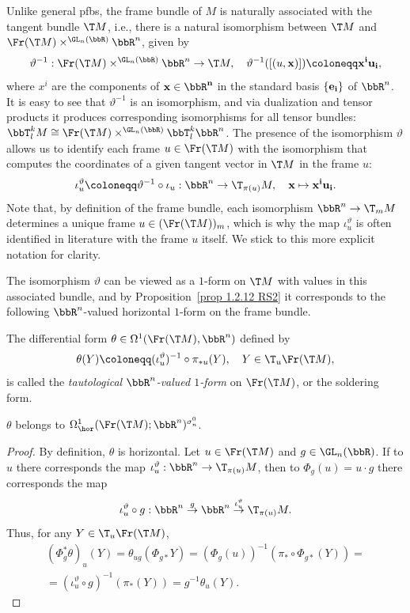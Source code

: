 Unlike general \glspl{pfb}, the frame bundle of $M$ is naturally associated with the tangent bundle $\T M$, i.e., there is a natural isomorphism between $\T M$ and  $\Fr(\T M)\times^{\GL_n(\bbR)}\bbR^n$, given by
\[\vartheta^{-1}:\Fr(\T M) \times^{\GL_n(\bbR)} \bbR^n\to \T M,\quad \vartheta^{-1}([(u,\bf{x})])\coloneqq x^iu_i,\label{eq 2.1.2 RS2}\]
where $x^i$ are the components of $\bf{x}\in\bbR^n$ in the standard basis $\{\bf{e}_i\}$ of $\bbR^n$. It is easy to see that $\vartheta^{-1}$ is an isomorphism, and via dualization and tensor products it produces corresponding isomorphisms for all tensor bundles: $\bbT^k_l M\cong \Fr(\T M)\times^{\GL_n(\bbR)}\bbT^k_l\bbR^n$. The presence of the isomorphism $\vartheta$ allows us to identify each frame $u\in \Fr(\T M)$ with the isomorphism that computes the coordinates of a given tangent vector in $\T M$ in the frame $u$:
\[\iota_u^\vartheta\coloneqq \vartheta^{-1}\circ\iota_u:\bbR^n\to \T_{\pi(u)}M,\quad \bf{x}\mapsto x^i u_i.\]
Note that, by definition of the frame bundle, each isomorphism $\bbR^n\to \T_mM$ determines a unique frame $u\in (\Fr(\T M))_m$, which is why the map $\iota_u^\vartheta$ is often identified in literature with the frame $u$ itself. We stick to this more explicit notation for clarity.

The isomorphism $\vartheta$ can be viewed as a $1$-form on $\T M$ with values in this associated bundle, and by Proposition~\ref{prop 1.2.12 RS2} it corresponds to the following $\bbR^n$-valued horizontal $1$-form on the frame bundle.

\begin{defn}
    The differential form $\theta\in\Omega^1(\Fr(\T M),\bbR^n)$ defined by
    \[\theta(Y)\coloneqq (\iota_u^\vartheta)^{-1}\circ\pi_{\ast u}(Y),\quad Y\in \T_u\Fr(\T M),\]
    is called the \emph{tautological $\bbR^n$-valued $1$-form} on $\Fr(\T M)$, or the soldering form.
\end{defn}


\begin{prop}[{{\cite[Prop.~2.1.4]{RS2}}}]\label{prop 2.1.4 RS2}
    $\theta$ belongs to $\Omega^1_{\hor}(\Fr(\T M); \bbR^n)^{\sigma_n^0}$.
\end{prop}
\begin{proof}
    By definition, $\theta$ is horizontal. Let $u\in\Fr(\T M)$ and $g\in \GL_n(\bbR)$. If to $u$ there corresponds the map $\iota^\vartheta_u:\bbR^n\to \T_{\pi(u)}M$, then to $\Phi_g(u)=u\cdot g$ there corresponds the map
    \[\iota_u^\vartheta\circ g:\bbR^n\overset{g}{\to} \bbR^n\overset{\iota_u^\vartheta}{\to} \T_{\pi(u)}M.\] 
    Thus, for any $Y\in \T_u \Fr(\T M)$,
    \begin{multline}
        (\Phi^\ast_g \theta)_u(Y)=\theta_{ug}(\Phi_{g\ast}Y)=(\Phi_g(u))^{-1}(\pi_\ast\circ \Phi_{g\ast}(Y))=\\
        =(\iota_u^\vartheta\circ g)^{-1}(\pi_\ast (Y))=g^{-1}\theta_u(Y).
    \end{multline}
\end{proof}

